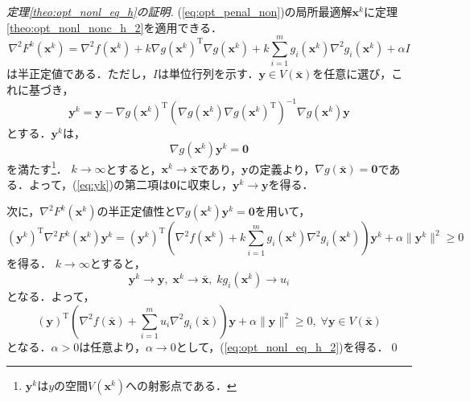 \documentclass[dvipdfmx]{jsreport}
\begin{document}
\begin{proof}[定理\ref{theo:opt_nonl_eq_h}の証明]
(\ref{eq:opt_penal_non})の局所最適解$\bm{x}^k$に定理\ref{theo:opt_nonl_nonc_h_2}を適用できる．
\begin{equation}
  \nabla^2 F^k(\bm{x}^k) = \nabla^2 f(\bm{x}^k) + k \nabla g(\bm{x}^k)^{\mathrm{T}} \nabla g(\bm{x}^k) + k \sum_{i = 1}^m g_i(\bm{x}^k) \nabla^2 g_i(\bm{x}^k) + \alpha I \nonumber
\end{equation}
は半正定値である．ただし，$I$は単位行列を示す．$\bm{y} \in V(\bar{\bm{x}})$を任意に選び，これに基づき，
\begin{equation}\label{eq:yk}
  \bm{y}^k = \bm{y} - \nabla g(\bm{x}^k)^{\mathrm{T}} (\nabla g(\bm{x}^k)\nabla g(\bm{x}^k)^{\mathrm{T}})^{-1} \nabla g(\bm{x}^k) \bm{y}
\end{equation}
とする．$\bm{y}^k$は，
\begin{equation}
  \nabla g(\bm{x}^k) \bm{y}^k = \bm{0} \nonumber
\end{equation}
を満たす\footnote{$\bm{y}^k$は$y$の空間$V(\bm{x}^k)$への射影点である．}．
$k \rightarrow \infty$とすると，$\bm{x}^k \rightarrow \bar{\bm{x}}$であり，$\bm{y}$の定義より，$\nabla g(\bar{\bm{x}}) = \bm{0}$である．よって，(\ref{eq:yk})の第二項は$\bm{0}$に収束し，$\bm{y}^k \rightarrow \bm{y}$を得る．

次に，$\nabla^2 F^k(\bm{x}^k)$の半正定値性と$\nabla g(\bm{x}^k)\bm{y}^k = \bm{0}$を用いて，
\begin{equation}
  (\bm{y}^k)^{\mathrm{T}} \nabla^2 F^k(\bm{x}^k) \bm{y}^k = (\bm{y}^k)^{\mathrm{T}} \left(\nabla^2 f(\bm{x}^k) + k \sum_{i = 1}^m g_i(\bm{x}^k) \nabla^2 g_i(\bm{x}^k) \right) \bm{y}^k + \alpha \|\bm{y}^k\|^2 \geq 0 \nonumber
\end{equation}
を得る．
$k \rightarrow \infty$とすると，
\begin{equation}
  \bm{y}^k \rightarrow \bm{y}, \; \bm{x}^k \rightarrow \bar{\bm{x}}, \; kg_i(\bm{x}^k) \rightarrow u_i \nonumber
\end{equation}
となる．よって，
\begin{equation}
 (\bm{y})^{\mathrm{T}} \left(\nabla^2 f(\bar{\bm{x}}) + \sum_{i = 1}^m u_i \nabla^2 g_i(\bar{\bm{x}}) \right) \bm{y} + \alpha \|\bm{y}\|^2 \geq 0, \; \forall \bm{y} \in V(\bar{\bm{x}}) \nonumber
\end{equation}
となる．$\alpha > 0$は任意より，$\alpha \rightarrow 0$として，(\ref{eq:opt_nonl_eq_h_2})を得る．\qed
\end{proof}
\end{document}
